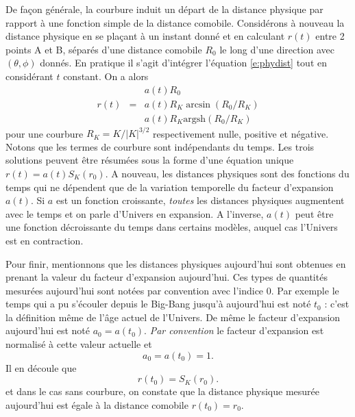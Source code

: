 De façon générale, la courbure induit un départ de la distance physique par rapport à une fonction simple de la distance comobile. Considérons à nouveau la distance physique en se plaçant à un instant donné et en calculant $r(t)$ entre 2 points A et B, séparés d'une distance comobile $R_0$ le long d'une direction avec $(\theta,\phi)$ donnés. En pratique il s'agit d'intégrer l'équation \ref{e:phydist} tout en considérant $t$ constant. On a alors
\begin{eqnarray}
&&a(t)R_0\\
r(t)&=&a(t)R_K \arcsin(R_0/R_K)\\
&&a(t)R_K \mathrm{argsh}(R_0/R_K)
\end{eqnarray}
pour une courbure $R_K=K/|K|^{3/2}$ respectivement nulle, positive et négative. Notons que les termes de courbure sont indépendants du temps. Les trois solutions peuvent être résumées sous la forme d'une équation unique $r(t)=a(t)S_K(r_0)$. A nouveau, les distances physiques sont des fonctions du temps qui ne dépendent que de la variation temporelle du facteur d'expansion $a(t)$. Si $a$ est un fonction croissante, \textit{toutes} les distances physiques augmentent avec le temps et on parle d'Univers en expansion. A l'inverse, $a(t)$ peut être une fonction décroissante du temps dans certains modèles, auquel cas l'Univers est en contraction.

Pour finir, mentionnons que les distances physiques aujourd'hui sont obtenues en prenant la valeur du facteur d'expansion aujourd'hui. Ces types de quantités mesurées aujourd'hui sont notées par convention avec l'indice 0. Par exemple le temps qui a pu s'écouler depuis le Big-Bang jusqu'à aujourd'hui est noté $t_0$ : c'est la définition même de l'âge actuel de l'Univers. De même le facteur d'expansion aujourd'hui est noté $a_0=a(t_0)$.
\textit{Par convention} le facteur d'expansion est normalisé à cette valeur actuelle et 
\begin{equation}
a_0=a(t_0)=1.
\end{equation}
Il en découle que 
\begin{equation}
r(t_0)=S_K(r_0).
\end{equation}
et dans le cas sans courbure, on constate que la distance physique mesurée aujourd'hui est égale à la distance comobile $r(t_0)=r_0$.

